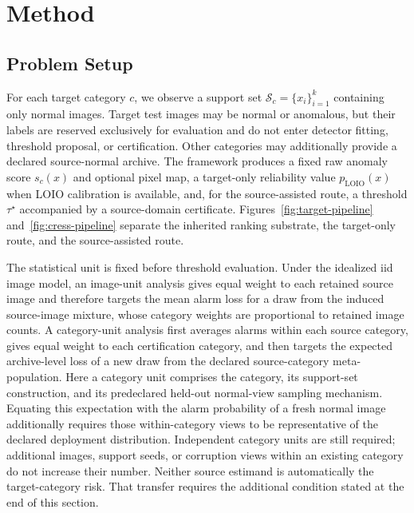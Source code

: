 \section{Method}\label{sec:method}
\subsection{Problem Setup}
For each target category $c$, we observe a support set $\mathcal{S}_c=\{x_i\}_{i=1}^{k}$ containing only normal images. Target test images may be normal or anomalous, but their labels are reserved exclusively for evaluation and do not enter detector fitting, threshold proposal, or certification. Other categories may additionally provide a declared source-normal archive. The framework produces a fixed raw anomaly score $s_c(x)$ and optional pixel map, a target-only reliability value $p_{\mathrm{LOIO}}(x)$ when LOIO calibration is available, and, for the source-assisted route, a threshold $\tau^\star$ accompanied by a source-domain certificate. Figures~\ref{fig:target-pipeline} and~\ref{fig:cress-pipeline} separate the inherited ranking substrate, the target-only route, and the source-assisted route.

The statistical unit is fixed before threshold evaluation. Under the idealized iid image model, an image-unit analysis gives equal weight to each retained source image and therefore targets the mean alarm loss for a draw from the induced source-image mixture, whose category weights are proportional to retained image counts. A category-unit analysis first averages alarms within each source category, gives equal weight to each certification category, and then targets the expected archive-level loss of a new draw from the declared source-category meta-population. Here a category unit comprises the category, its support-set construction, and its predeclared held-out normal-view sampling mechanism. Equating this expectation with the alarm probability of a fresh normal image additionally requires those within-category views to be representative of the declared deployment distribution. Independent category units are still required; additional images, support seeds, or corruption views within an existing category do not increase their number. Neither source estimand is automatically the target-category risk. That transfer requires the additional condition stated at the end of this section.

